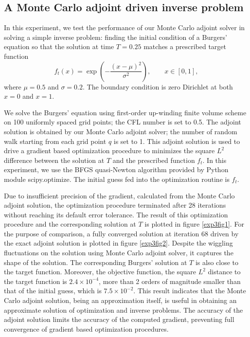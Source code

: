 \documentclass[a4paper,11pt]{article}
\theoremstyle{remark}
\theoremstyle{definition}
\begin{document}
 
    \subsection{A Monte Carlo adjoint driven inverse problem}
        In this experiment, we test the performance of our Monte Carlo adjoint
        solver in solving a simple inverse problem: finding the initial
        condition of a Burgers' equation so that the solution at time $T=0.25$
        matches a prescribed target function
        \[ f_t(x) = \exp\left(-\frac{(x-\mu)^2}{\sigma^2}\right),
           \qquad x \in [0, 1],
        \]
        where $\mu = 0.5$ and $\sigma = 0.2$.  The boundary condition is
        zero Dirichlet at both $x=0$ and $x=1$.

        We solve the Burgers' equation using first-order up-winding finite
        volume scheme on 100 uniformly spaced grid points; the CFL number
        is set to 0.5.  The adjoint solution is obtained by our Monte Carlo
        adjoint solver; the number of random walk starting from each grid
        point $q$ is set to 1.  This adjoint solution is used to drive a
        gradient based optimization procedure to minimizes the square $L^2$
        difference between the solution at $T$ and the prescribed function
        $f_t$.  In this experiment, we use the BFGS quasi-Newton algorithm
        provided by Python module scipy.optimize.  The initial guess fed
        into the optimization routine is $f_t$.
        
        Due to insufficient precision of the gradient, calculated from the
        Monte Carlo adjoint solution, the optimization procedure terminated
        after 28 iterations without reaching its default error tolerance.
        The result of this optimization procedure and the corresponding
        solution at $T$ is plotted in figure \ref{exp3fig1}.  For the
        purpose of comparison, a fully converged solution at iteration 68
        driven by the exact adjoint solution is plotted in figure
        \ref{exp3fig2}.  Despite the wiggling fluctuations on the solution
        using Monte Carlo adjoint solver, it captures the shape of the
        solution.  The corresponding Burgers' solution at $T$ is also close
        to the target function.  Moreover, the objective function, the square
        $L^2$ distance to the target function is $2.4\times 10^{-4}$, more
        than 2 orders of magnitude smaller than that of the initial guess,
        which is $7.5\times 10^{-2}$.  This result indicates that the
        Monte Carlo adjoint solution, being an approximation itself, is
        useful in obtaining an approximate solution of optimization and
        inverse problems.  The accuracy of the adjoint solution limits the
        accuracy of the computed gradient, preventing full convergence
        of gradient based optimization procedures.
\end{document}
